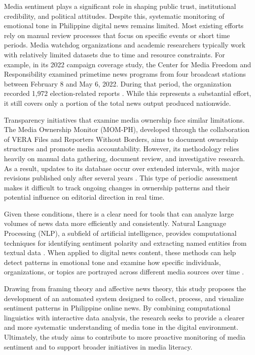 Media sentiment plays a significant role in shaping public trust, institutional credibility, and political attitudes. Despite this, systematic monitoring of emotional tone in Philippine digital news remains limited. Most existing efforts rely on manual review processes that focus on specific events or short time periods. Media watchdog organizations and academic researchers typically work with relatively limited datasets due to time and resource constraints. For example, in its 2022 campaign coverage study, the Center for Media Freedom and Responsibility examined primetime news programs from four broadcast stations between February 8 and May 6, 2022. During that period, the organization recorded 1,972 election-related reports \cite{ref17}. While this represents a substantial effort, it still covers only a portion of the total news output produced nationwide.

Transparency initiatives that examine media ownership face similar limitations. The Media Ownership Monitor (MOM-PH), developed through the collaboration of VERA Files and Reporters Without Borders, aims to document ownership structures and promote media accountability. However, its methodology relies heavily on manual data gathering, document review, and investigative research. As a result, updates to its database occur over extended intervals, with major revisions published only after several years \cite{ref24}. This type of periodic assessment makes it difficult to track ongoing changes in ownership patterns and their potential influence on editorial direction in real time.

Given these conditions, there is a clear need for tools that can analyze large volumes of news data more efficiently and consistently. Natural Language Processing (NLP), a subfield of artificial intelligence, provides computational techniques for identifying sentiment polarity and extracting named entities from textual data \cite{ref01,ref08,ref09}. When applied to digital news content, these methods can help detect patterns in emotional tone and examine how specific individuals, organizations, or topics are portrayed across different media sources over time \cite{ref16}.

Drawing from framing theory and affective news theory, this study proposes the development of an automated system designed to collect, process, and visualize sentiment patterns in Philippine online news. By combining computational linguistics with interactive data analysis, the research seeks to provide a clearer and more systematic understanding of media tone in the digital environment. Ultimately, the study aims to contribute to more proactive monitoring of media sentiment and to support broader initiatives in media literacy.

